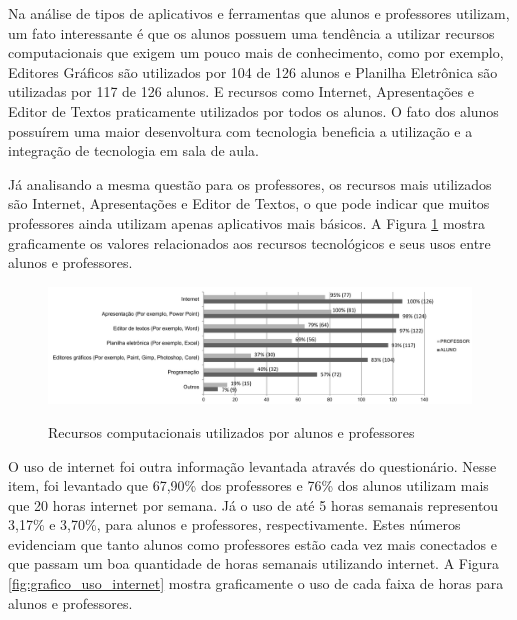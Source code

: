 Na análise de tipos de aplicativos e ferramentas que alunos e professores utilizam, um fato interessante é que os alunos possuem uma tendência a utilizar recursos computacionais que exigem um pouco mais de conhecimento, como por exemplo, Editores Gráficos são utilizados por 104 de 126 alunos e Planilha Eletrônica são utilizadas por 117 de 126 alunos. E recursos como Internet, Apresentações e Editor de Textos praticamente utilizados por todos os alunos. O fato dos alunos possuírem uma maior desenvoltura com tecnologia beneficia a utilização e a integração de tecnologia em sala de aula.

Já analisando a mesma questão para os professores, os recursos mais utilizados são Internet, Apresentações e Editor de Textos, o que pode indicar que muitos professores ainda utilizam apenas aplicativos mais básicos. A Figura \ref{fig:grafico_recursos} mostra graficamente os valores relacionados aos recursos tecnológicos e seus usos entre alunos e professores.

\begin{figure}
\centering
\caption{Recursos computacionais utilizados por alunos e professores}
\includegraphics[width=1.0\textwidth]{pdfs/alunos-professores/recursos-computacionais.pdf} 
\label{fig:grafico_recursos} 
\end{figure}

O uso de internet foi outra informação levantada através do questionário. Nesse item, foi levantado que 67,90\% dos professores e 76\% dos alunos utilizam mais que 20 horas internet por semana. Já o uso de até 5 horas semanais representou 3,17\% e 3,70\%, para alunos e professores, respectivamente. Estes números evidenciam que tanto alunos como professores estão cada vez mais conectados e que passam um boa quantidade de horas semanais utilizando internet. A Figura \ref{fig:grafico_uso_internet} mostra graficamente o uso de cada faixa de horas para alunos e professores.

